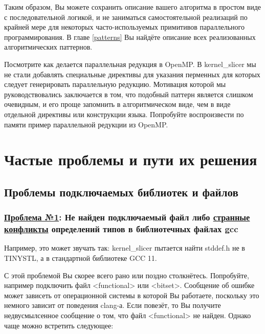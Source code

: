 \documentclass[11pt,fleqn,english,russian]{report} %
\begin{document}
Таким образом, Вы можете сохранить описание вашего алгоритма в простом виде с последовательной логикой, и не заниматься самостоятельной реализаций по крайней мере для некоторых часто-используемых примитивов параллельного программирования. В главе \ref{patterns} Вы найдёте описание всех реализованных алгоритмических паттернов.

\begin{remark}
Посмотрите как делается параллельная редукция в OpenMP. В kernel\_slicer мы не стали добавлять специальные директивы для указания перменных для которых следует генерировать параллельную редукцию. Мотивация которой мы руководствовались заключается в том, что подобный паттерн является слишком очевидным, и его проще запомнить в алгоритмическом виде, чем в виде отдельной директивы или конструкции языка. Попробуйте воспроизвести по памяти пример параллельной редукции из OpenMP. 
\end{remark}

\chapter{Частые проблемы и пути их решения}

\section{Проблемы подключаемых библиотек и файлов}

\subsection{\underline{Проблема №1}: Не найден подключаемый файл либо \underline{странные конфликты} определений типов в библиотечных файлах gcc}

Например, это может звучать так: kernel\_slicer пытается найти stddef.h не в TINYSTL, а в стандартной библиотеке GCC 11. 

С этой проблемой Вы скорее всего рано или поздно столкнётесь. Попробуйте, например подключить  файл <functional> или <bitset>. Сообщение об ошибке может зависеть от операционной системы в которой Вы работаете, поскольку это немного зависит от поведения clang-а. Если повезёт, то Вы получите недвусмылсенное сообщение о том, что файл <functional> не найден. Однако чаще можно встретить следующее:
\end{document}
